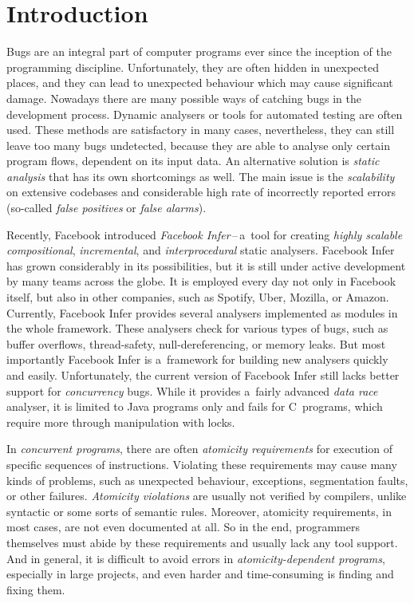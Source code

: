 

\chapter{Introduction}

Bugs are an integral part of computer programs ever since the inception
of the programming discipline. Unfortunately, they are often hidden
in unexpected places, and they can lead to unexpected behaviour which
may cause significant damage. Nowadays there are many possible
ways of catching bugs in the development process. Dynamic analysers
or tools for automated testing are often used. These methods
are satisfactory in many cases, nevertheless, they can still leave
too many bugs undetected, because they are able to analyse only
certain program flows, dependent on its input data. An alternative
solution is \emph{static analysis} that has its own shortcomings as
well. The main issue is the \emph{scalability} on extensive codebases and
considerable high rate of incorrectly reported errors (so-called
\emph{false positives} or \emph{false alarms}).

Recently, Facebook introduced \emph{Facebook Infer}\,--\,a~tool for
creating \emph{highly scalable} \emph{compositional}, \emph{incremental},
and \emph{interprocedural} static analysers. Facebook Infer has grown
considerably in its possibilities, but it is still under active development
by many teams across the globe. It is employed every day not only in
Facebook itself, but also in other companies, such as Spotify, Uber, Mozilla,
or Amazon. Currently, Facebook Infer provides several analysers implemented
as modules in the whole framework. These analysers check for various types
of bugs, such as buffer overflows, thread-safety, null-dereferencing, or
memory leaks. But most importantly Facebook Infer is a~framework for building
new analysers quickly and easily. Unfortunately, the current version of
Facebook Infer still lacks better support for \emph{concurrency} bugs.
While it provides a~fairly advanced \emph{data race} analyser, it is
limited to Java programs only and fails for C~programs, which require
more through manipulation with locks.

In \emph{concurrent programs}, there are often \emph{atomicity requirements}
for execution of specific sequences of instructions. Violating these
requirements may cause many kinds of problems, such as unexpected
behaviour, exceptions, segmentation faults, or other failures.
\emph{Atomicity violations} are usually not verified by compilers,
unlike syntactic or some sorts of semantic rules. Moreover, atomicity
requirements, in most cases, are not even documented at all. So in the
end, programmers themselves must abide by these requirements and usually
lack any tool support. And in general, it is difficult to avoid
errors in \emph{atomicity-dependent programs}, especially in large projects,
and even harder and time-consuming is finding and fixing them.

